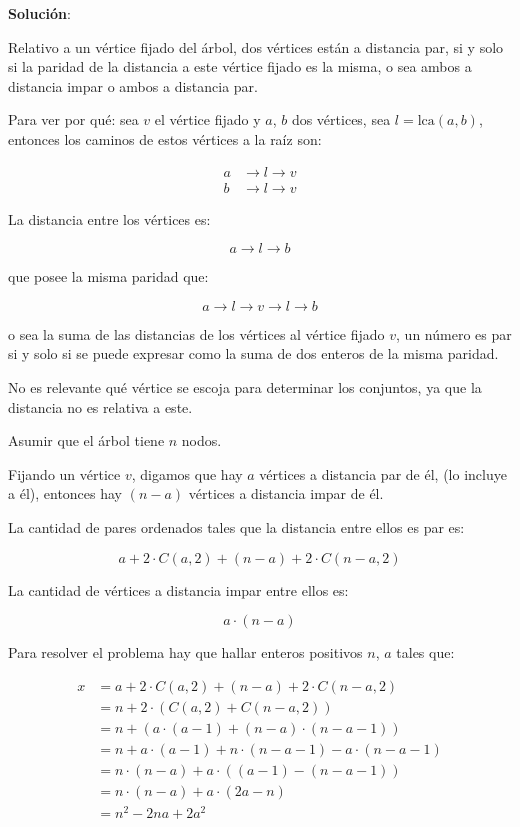\documentclass[14pt]{extarticle}
\begin{document}
\textbf{Solución}: 

Relativo a un vértice fijado del árbol, dos vértices están a distancia par, si y solo si la paridad de la distancia a este vértice fijado es la misma, o sea ambos a distancia impar o ambos a distancia par.

Para ver por qué: sea $v$ el vértice fijado y $a$, $b$ dos vértices, sea $l = \text{lca}(a, b)$, entonces los caminos de estos vértices a la raíz son:

\begin{align*}
a &\rightarrow l \rightarrow v \\
b &\rightarrow l \rightarrow v
\end{align*}

La distancia entre los vértices es:

\[
a \rightarrow l \rightarrow b
\]

que posee la misma paridad que:

\[
a \rightarrow l \rightarrow v \rightarrow l \rightarrow b
\]

o sea la suma de las distancias de los vértices al vértice fijado $v$, un número es par si y solo si se puede expresar como la suma de dos enteros de la misma paridad.

No es relevante qué vértice se escoja para determinar los conjuntos, ya que la distancia no es relativa a este.

Asumir que el árbol tiene $n$ nodos.

Fijando un vértice $v$, digamos que hay $a$ vértices a distancia par de él, (lo incluye a él), entonces hay $(n-a)$ vértices a distancia impar de él.

La cantidad de pares ordenados tales que la distancia entre ellos es par es:

\[
a + 2 \cdot C(a, 2) + (n-a) + 2 \cdot C(n-a, 2)
\]

La cantidad de vértices a distancia impar entre ellos es:

\[
a \cdot (n-a)
\]

Para resolver el problema hay que hallar enteros positivos $n$, $a$ tales que:

\begin{align*}
x &= a + 2 \cdot C(a, 2) + (n-a) + 2 \cdot C(n-a, 2) \\
  &= n + 2 \cdot (C(a,2) + C(n-a, 2)) \\
  &= n + (a \cdot (a-1) + (n-a) \cdot (n-a-1)) \\
  &= n + a \cdot (a-1) + n \cdot (n - a - 1) - a \cdot (n-a-1) \\
  &= n \cdot (n - a) + a \cdot ((a-1) - (n-a-1)) \\
  &= n \cdot (n - a) + a \cdot (2a - n) \\
  &= n^2 - 2na + 2a^2
\end{align*}
\end{document}
